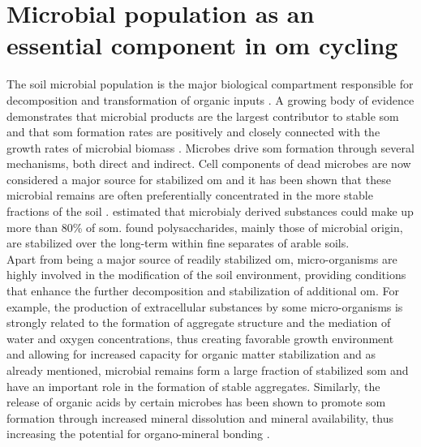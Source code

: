 \documentclass[12pt]{report}
\begin{document}
		
		\section{Microbial population as an essential component in \gls{om} cycling}
		
		The soil microbial population is the major biological compartment responsible for decomposition and transformation of organic inputs \citep{thiet2006}. A growing body of evidence demonstrates that microbial products are the largest contributor to stable \gls{som} and that \gls{som} formation rates are positively and closely connected with the growth rates of microbial biomass \citep{kallenbach2016, kallenbach2015, ludwig2015, schurig2013, bradford2013}. Microbes drive \gls{som} formation through several mechanisms, both direct and indirect. Cell components of dead microbes are now considered a major source for stabilized \gls{om} \citep{kallenbach2015, liang2011, miltner2009} and it has been shown that these microbial remains are often preferentially concentrated in the more stable fractions of the soil \citep{ludwig2015}. \citet{liang2011} estimated that microbialy derived substances could make up more than 80\% of \gls{som}⁠.
		\citet{kiem2003} found polysaccharides, mainly those of microbial origin, are stabilized over the long-term within fine separates of arable soils.\\
		Apart from being a major source of readily stabilized \gls{om}, micro-organisms are highly involved in the  modification of the soil environment, providing conditions that enhance the further decomposition and stabilization of additional \gls{om}.  For example, the production of extracellular substances by some micro-organisms is strongly related to the formation of aggregate structure and the mediation of water and oxygen concentrations, thus creating favorable growth environment and allowing for increased capacity for organic matter stabilization \citep{schimel2012} ⁠and as already mentioned, microbial remains form a large fraction of stabilized \gls{som} and have an important role in the formation of stable aggregates. Similarly, the release of organic acids by certain microbes has been shown to promote \gls{som} formation through increased mineral dissolution and mineral availability, thus increasing the potential for organo-mineral bonding \citep{yu2018}.
		
		
		
\end{document}
